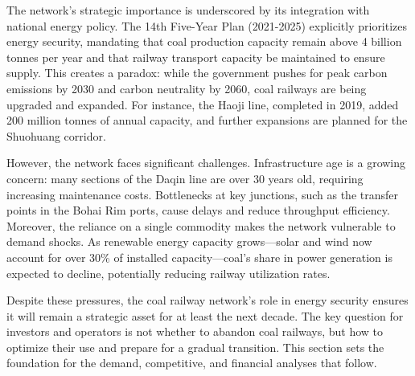 \documentclass[10pt,a4paper]{article}
\begin{document}
{\small The network's strategic importance is underscored by its integration with national energy policy. The 14th Five-Year Plan (2021-2025) explicitly prioritizes energy security, mandating that coal production capacity remain above 4 billion tonnes per year and that railway transport capacity be maintained to ensure supply. This creates a paradox: while the government pushes for peak carbon emissions by 2030 and carbon neutrality by 2060, coal railways are being upgraded and expanded. For instance, the Haoji line, completed in 2019, added 200 million tonnes of annual capacity, and further expansions are planned for the Shuohuang corridor.}

{\small However, the network faces significant challenges. Infrastructure age is a growing concern: many sections of the Daqin line are over 30 years old, requiring increasing maintenance costs. Bottlenecks at key junctions, such as the transfer points in the Bohai Rim ports, cause delays and reduce throughput efficiency. Moreover, the reliance on a single commodity makes the network vulnerable to demand shocks. As renewable energy capacity grows—solar and wind now account for over 30\% of installed capacity—coal's share in power generation is expected to decline, potentially reducing railway utilization rates.}
\vspace{3pt}\noindent{}\vspace{4pt}

\vspace{4pt}{\textcolor{BOBlue}{\scriptsize\bfseries DIAGNOSTIC ARCHITECTURE MAP}}\par
\begin{center}\end{center}

{\small {\small Despite these pressures, the coal railway network's role in energy security ensures it will remain a strategic asset for at least the next decade. The key question for investors and operators is not whether to abandon coal railways, but how to optimize their use and prepare for a gradual transition. This section sets the foundation for the demand, competitive, and financial analyses that follow.}}
\end{document}
